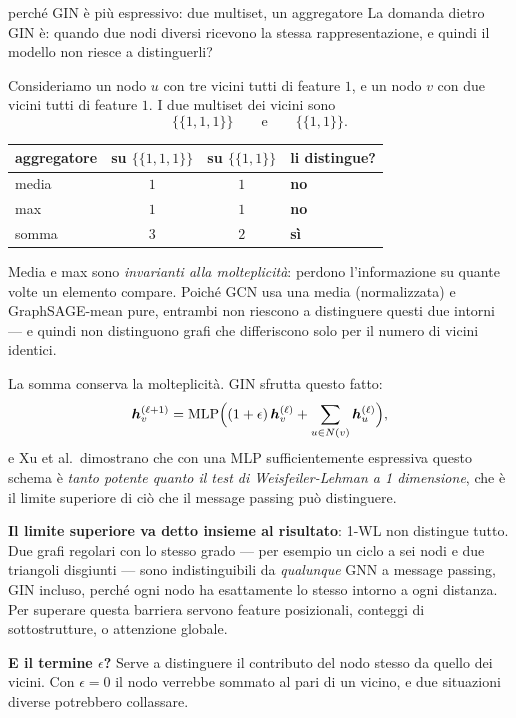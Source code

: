 \begin{esempiosvolto}{perché GIN è più espressivo: due multiset, un aggregatore}
La domanda dietro GIN è: quando due nodi diversi ricevono la stessa rappresentazione, e quindi il modello non riesce a distinguerli?

Consideriamo un nodo $u$ con tre vicini tutti di feature $1$, e un nodo $v$ con due vicini tutti di feature $1$. I due multiset dei vicini sono
\[
\{\!\{1, 1, 1\}\!\} \qquad \text{e} \qquad \{\!\{1, 1\}\!\}.
\]

\begin{center}
\begin{tabular}{lccl}
\toprule
aggregatore & su $\{\!\{1,1,1\}\!\}$ & su $\{\!\{1,1\}\!\}$ & li distingue? \\
\midrule
media  & $1$ & $1$ & \textbf{no} \\
max    & $1$ & $1$ & \textbf{no} \\
somma  & $3$ & $2$ & \textbf{sì} \\
\bottomrule
\end{tabular}
\end{center}

Media e max sono \emph{invarianti alla molteplicità}: perdono l'informazione su quante volte un elemento compare. Poiché GCN usa una media (normalizzata) e GraphSAGE-mean pure, entrambi non riescono a distinguere questi due intorni — e quindi non distinguono grafi che differiscono solo per il numero di vicini identici.

La somma conserva la molteplicità. GIN sfrutta questo fatto:
\[
\bm{h}_v^{(\ell+1)} = \mathrm{MLP}\Big((1+\epsilon)\,\bm{h}_v^{(\ell)} + \sum_{u \in N(v)} \bm{h}_u^{(\ell)}\Big),
\]
e Xu et al.\ dimostrano che con una MLP sufficientemente espressiva questo schema è \emph{tanto potente quanto il test di Weisfeiler-Lehman a 1 dimensione}, che è il limite superiore di ciò che il message passing può distinguere.

\textbf{Il limite superiore va detto insieme al risultato}: 1-WL non distingue tutto. Due grafi regolari con lo stesso grado — per esempio un ciclo a sei nodi e due triangoli disgiunti — sono indistinguibili da \emph{qualunque} GNN a message passing, GIN incluso, perché ogni nodo ha esattamente lo stesso intorno a ogni distanza. Per superare questa barriera servono feature posizionali, conteggi di sottostrutture, o attenzione globale.

\textbf{E il termine $\epsilon$?} Serve a distinguere il contributo del nodo stesso da quello dei vicini. Con $\epsilon = 0$ il nodo verrebbe sommato al pari di un vicino, e due situazioni diverse potrebbero collassare.
\end{esempiosvolto}

